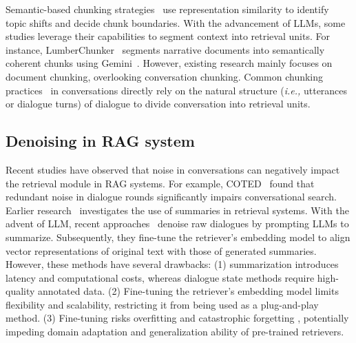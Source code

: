 Semantic-based chunking strategies~\citep{anurag2023chunkingstrategies, antematter2024optimizing, kamradt2024semantic} use representation similarity to identify topic shifts and decide chunk boundaries. 
With the advancement of LLMs, some studies leverage their capabilities to segment context into retrieval units. For instance, 
LumberChunker~\citep{duarte2024lumberchunker} segments narrative documents into semantically coherent chunks using Gemini~\citep{team2023gemini}. However, existing research mainly focuses on document chunking, overlooking conversation chunking. Common chunking practices~\citep{langchain2023conversational, llamaindex2023buffer} in conversations directly rely on the natural structure (\textit{i.e.,} utterances or dialogue turns) of dialogue to divide conversation into retrieval units.

\subsection{Denoising in RAG system}
Recent studies have observed that noise in conversations can negatively impact the retrieval module in RAG systems. For example, COTED~\citep{mao2022curriculum} found that redundant noise in dialogue rounds significantly impairs conversational search. 
Earlier research~\citep{strzalkowski1998summarization, wasson2002using} investigates the use of summaries in retrieval systems. With the advent of LLM, recent approaches~\citep{ravfogel2023retrieving, lee2024effective} denoise raw dialogues by prompting LLMs to summarize. Subsequently, they fine-tune the retriever's embedding model to align vector representations of original text with those of generated summaries. However, these methods have several drawbacks: (1) summarization introduces latency and computational costs, whereas dialogue state methods require high-quality annotated data. (2) Fine-tuning the retriever's embedding model limits flexibility and scalability, restricting it from being used as a plug-and-play method. (3) Fine-tuning risks overfitting and catastrophic forgetting \citep{mccloskey1989catastrophic, lee2022sequential}, potentially impeding domain adaptation and generalization ability of pre-trained retrievers.